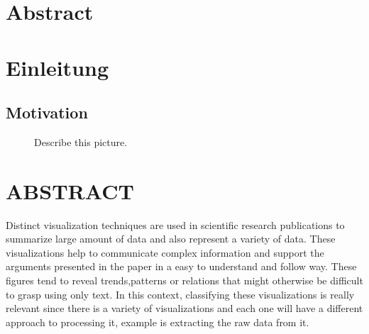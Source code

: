 \documentclass[12pt, a4paper,oneside]{report}
\begin{document}


\setcounter{tocdepth}{10}
\tableofcontents






\listoffigures
\listoftables

\titleformat{\chapter}{\LARGE\bfseries}{\thechapter}{1em}{}



\chapter*{Abstract}


\newpage
\chapter{Einleitung}

\section{Motivation}

\begin{figure}[!ht]
	\centering
	\caption{Describe this picture.}
	\label{fig:1}
\end{figure}

\chapter{ABSTRACT}
Distinct visualization techniques are used in scientific research publications to summarize large amount of data and also represent a variety of data. These visualizations help to communicate complex information and support the arguments presented in the paper in a easy to understand and follow way.
These figures tend to reveal trends,patterns or relations that might otherwise be difficult to grasp using only text. In this context, classifying these visualizations is really relevant since there is a variety of visualizations and each one will have a different approach to processing it, example is extracting the raw data from it. 
\end{document}
